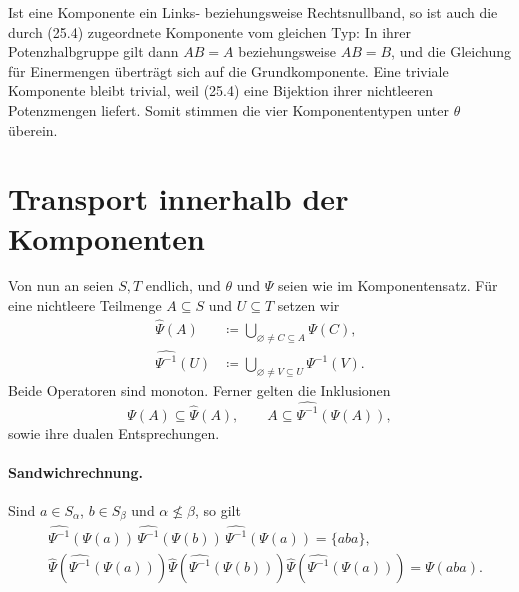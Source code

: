 \documentclass[main.tex]{subfiles}
\begin{document}
Ist eine Komponente ein Links- beziehungsweise Rechtsnullband, so ist auch
die durch (25.4) zugeordnete Komponente vom gleichen Typ: In ihrer
Potenzhalbgruppe gilt dann \(AB=A\) beziehungsweise \(AB=B\), und die
Gleichung für Einermengen überträgt sich auf die Grundkomponente.  Eine
triviale Komponente bleibt trivial, weil (25.4) eine Bijektion ihrer
nichtleeren Potenzmengen liefert.  Somit stimmen die vier Komponententypen
unter \(\theta\) überein.

\section{Transport innerhalb der Komponenten}

Von nun an seien \(S,T\) endlich, und \(\theta\) und \(\Psi\) seien wie
im Komponentensatz.  Für eine nichtleere Teilmenge \(A\subseteq S\) und
\(U\subseteq T\) setzen wir
\[
\begin{aligned}
 \widehat\Psi(A)
   &\coloneqq\bigcup_{\varnothing\neq C\subseteq A}\Psi(C),\\
 \widehat{\Psi^{-1}}(U)
   &\coloneqq\bigcup_{\varnothing\neq V\subseteq U}\Psi^{-1}(V).
\end{aligned}                                                   \tag{25.8}
\]
Beide Operatoren sind monoton.  Ferner gelten die Inklusionen
\[
 \Psi(A)\subseteq\widehat\Psi(A),
 \qquad
 A\subseteq\widehat{\Psi^{-1}}(\Psi(A)),
\]
sowie ihre dualen Entsprechungen.

\paragraph{Sandwichrechnung.}
Sind \(a\in S_\alpha\), \(b\in S_\beta\) und
\(\alpha\nleq\beta\), so gilt
\begin{align}
&\widehat{\Psi^{-1}}(\Psi(a))\,
 \widehat{\Psi^{-1}}(\Psi(b))\,
 \widehat{\Psi^{-1}}(\Psi(a))=\{aba\},                  \tag{25.9}\\
&\widehat\Psi\!\left(\widehat{\Psi^{-1}}(\Psi(a))\right)
 \widehat\Psi\!\left(\widehat{\Psi^{-1}}(\Psi(b))\right)
 \widehat\Psi\!\left(\widehat{\Psi^{-1}}(\Psi(a))\right)
 =\Psi(aba).                                               \tag{25.10}
\end{align}
\end{document}
